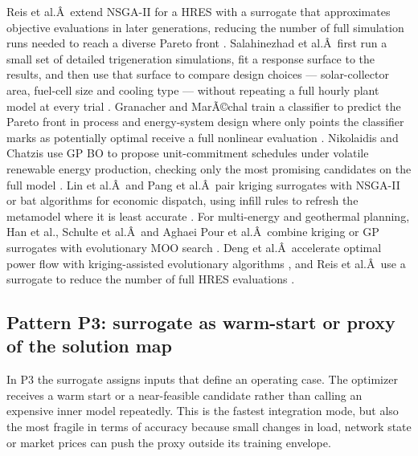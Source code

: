\documentclass[final,5p,times,twocolumn]{elsarticle}
\begin{document}
Reis et al.Â~extend NSGA-II for a HRES with a surrogate that approximates
objective evaluations in later generations, reducing the number of full
simulation runs needed to reach a diverse Pareto front \cite{Reis2025}.
Salahinezhad et al.Â~first run a small set of detailed trigeneration
simulations, fit a response surface to the results, and then use that
surface to compare design choices --- solar-collector area, fuel-cell
size and cooling type --- without repeating a full hourly plant model at
every trial \cite{Salahinezhad2025}. Granacher and MarÃ©chal train a
classifier to predict the Pareto front in process and energy-system
design where only points the classifier marks as potentially optimal
receive a full nonlinear evaluation \cite{Granacher20221573}. Nikolaidis and
Chatzis use GP BO to propose unit-commitment schedules under volatile
renewable energy production, checking only the most promising candidates
on the full model \cite{Nikolaidis2021}. Lin et al.Â~and Pang et al.Â~pair
kriging surrogates with NSGA-II or bat algorithms for economic dispatch,
using infill rules to refresh the metamodel where it is least accurate
\cite{Lin2023,Pang2023}. For multi-energy and geothermal planning, Han et
al., Schulte et al.Â~and
Aghaei Pour et al.Â~combine kriging or GP surrogates with evolutionary
MOO search \cite{Han2018622,Schulte2020,Aghaei Pour2022303}. Deng et
al.Â~accelerate optimal power flow with kriging-assisted evolutionary
algorithms \cite{Deng2020831}, and Reis et al.Â~use a surrogate to reduce
the number of full HRES evaluations \cite{Reis2025}.

\subsection{Pattern P3: surrogate as warm-start or proxy of the solution map}
\label{sec:int:warmstart}

In P3 the surrogate assigns inputs that define an operating case. The
optimizer receives a warm start or a near-feasible candidate rather than
calling an expensive inner model repeatedly. This is the fastest
integration mode, but also the most fragile in terms of accuracy because
small changes in load, network state or market prices can push the proxy
outside its training envelope.
\end{document}
